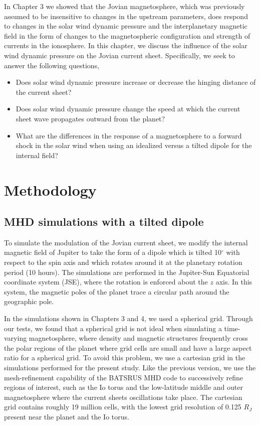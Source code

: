 In Chapter 3 we showed that the Jovian magnetosphere, which was previously assumed to be insensitive to changes in the upstream parameters, does respond to changes in the solar wind dynamic pressure and the interplanetary magnetic field in the form of changes to the magnetospheric configuration and strength of currents in the ionosphere. In this chapter, we discuss the influence of the solar wind dynamic pressure on the Jovian current sheet. Specifically, we seek to answer the following questions,

\begin{itemize}
    \item Does solar wind dynamic pressure increase or decrease the hinging distance of the current sheet?
    \item Does solar wind dynamic pressure change the speed at which the current sheet wave propagates outward from the planet?
    \item What are the differences in the response of a magnetosphere to a forward shock in the solar wind when using an idealized versus a tilted dipole for the internal field?
\end{itemize}


\section{Methodology}

\subsection{MHD simulations with a tilted dipole}
To simulate the modulation of the Jovian current sheet, we modify the internal magnetic field of Jupiter to take the form of a dipole which is tilted 10$^\circ$ with respect to the spin axis and which rotates around it at the planetary rotation period (10 hours). The simulations are performed in the Jupiter-Sun Equatorial coordinate system (JSE), where the rotation is enforced about the $z$ axis. In this system, the magnetic poles of the planet trace a circular path around the geographic pole. 

In the simulations shown in Chapters 3 and 4, we used a spherical grid. Through our tests, we found that a spherical grid is not ideal when simulating a time-varying magnetosphere, where density and magnetic structures frequently cross the polar regions of the planet where grid cells are small and have a large aspect ratio for a spherical grid. To avoid this problem, we use a cartesian grid in the simulations performed for the present study. Like the previous version, we use the mesh-refinement capability of the BATSRUS MHD code to successively refine regions of interest, such as the Io torus and the low-latitude middle and outer magnetosphere where the current sheets oscillations take place. The cartesian grid contains roughly 19 million cells, with the lowest grid resolution of 0.125 $R_J$ present near the planet and the Io torus. 

